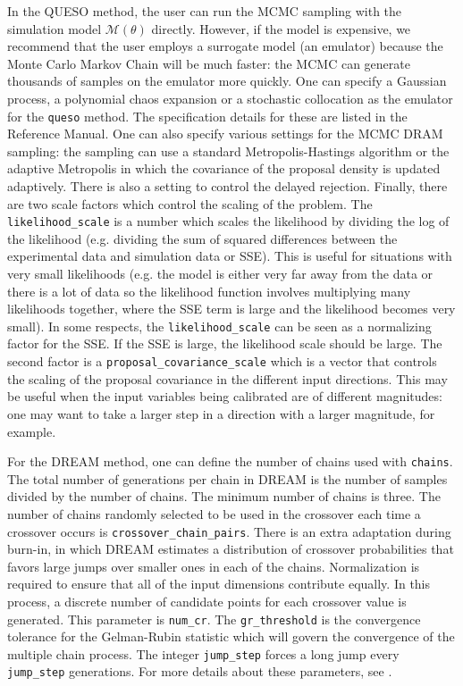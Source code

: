In the QUESO method, the user can run the MCMC sampling with 
the simulation model $\mathcal{M}(\theta)$ directly. However, 
if the model is expensive, we recommend that the user employs 
a surrogate model (an emulator) because the Monte Carlo Markov Chain 
will be much faster:  the MCMC can generate thousands of samples 
on the emulator more quickly. One can specify a Gaussian process,
a polynomial chaos expansion or a stochastic collocation 
as the emulator for the \texttt{queso} method. The specification 
details for these are listed in the Reference Manual. 
One can also specify various settings for the MCMC DRAM sampling: 
the sampling can use a standard Metropolis-Hastings algorithm 
or the adaptive Metropolis in which the covariance of the proposal 
density is updated adaptively. There is also a setting to control 
the delayed rejection. Finally, there are two scale factors 
which control the scaling of the problem. The 
\texttt{likelihood\_scale} is a number 
which scales the likelihood by dividing
the log of the likelihood (e.g. dividing the sum of squared differences
between the experimental data and simulation data or SSE).  This
is useful for situations with very small likelihoods (e.g. the model is either
very far away from the data or there is a lot of data so the likelihood function
involves multiplying many likelihoods together, where the SSE term is large
and the likelihood becomes very small).
In some respects, the \texttt{likelihood\_scale} can be seen as a normalizing factor
for the SSE.  If the SSE is large, the likelihood scale should be large.
The second factor is a \texttt{proposal\_covariance\_scale} 
which is a vector that controls the scaling of the proposal covariance
in the different input directions. This may be useful when the 
input variables being calibrated are of different magnitudes:  
one may want to take a larger step in a direction
with a larger magnitude, for example.
    
For the DREAM method, one can define the number of chains used with
\texttt{chains}.  The total number of generations per chain in DREAM is
the number of samples divided by the number of chains.
The minimum number of chains is three.
The number of chains randomly selected to be used in the crossover
each time a crossover occurs is \texttt{crossover\_chain\_pairs}.
There is an extra adaptation during burn-in, in which DREAM estimates a
distribution of crossover probabilities that favors large jumps over
smaller ones in each of the chains.
Normalization is required to ensure that all of the input dimensions contribute
equally.  In this process, a discrete number of candidate points for
each crossover value is generated.  This parameter is \texttt{num\_cr}.
The \texttt{gr\_threshold} is the convergence tolerance for the Gelman-Rubin
statistic which will govern the convergence of the multiple chain
process.  The integer \texttt{jump\_step} forces a long jump every 
\texttt{jump\_step} generations.
For more details about these parameters, see \cite{Vrugt}. 

